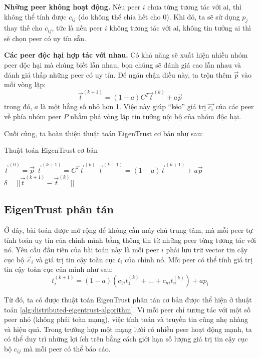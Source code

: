 \textbf{Những peer không hoạt động.} Nếu peer $i$ chưa từng tương tác với ai, thì không thể tính được $c_{ij}$ (do không thể chia hết cho 0).
Khi đó, ta sẽ sử dụng $p_j$ thay thế cho $c_{ij}$, tức là nếu peer $i$ không tương tác với ai, không tin tưởng ai thì sẽ chọn peer có uy tín sẵn.

\textbf{Các peer độc hại hợp tác với nhau.} Có khả năng sẽ xuất hiện nhiều nhóm peer độc hại mà chúng biết lẫn nhau, bọn chúng sẽ đánh giá cao lẫn nhau và đánh giá thấp những peer có uy tín.
Để ngăn chận điều này, ta trộn thêm $\vec{p}$ vào mỗi vòng lặp:
\[\vec{t}^{(k+1)} = (1 - a)C^{T}\vec{t}^{(k)} + a\vec{p}\]
trong đó, $a$ là một hằng số nhỏ hơn 1. Việc này giúp ``kéo'' giá trị $\vec{c_i}$ của các peer về phía nhóm peer $P$ nhằm phá vòng lặp tin tưởng nội bộ của nhóm độc hại.

Cuối cùng, ta hoàn thiện thuật toán EigenTrust cơ bản như sau:

\begin{algorithm}
  \caption{Thuật toán EigenTrust cơ bản}
  \label{alg:basic-eigentrust-algorithm}
  \begin{algorithmic}
    \State $\vec{t}^{(0)} = \vec{p}$
    \Repeat
    \State $\vec{t}^{(k+1)} = C^{T}\vec{t}^{(k)}$
    \State $\vec{t}^{(k+1)} = (1 - a)\vec{t}^{(k+1)} + a\vec{p}$
    \State $\delta = || \vec{t}^{(k+1)} - \vec{t}^{(k)} ||$
    \Until{$\delta < \epsilon$}
  \end{algorithmic}
\end{algorithm}

\subsection{EigenTrust phân tán}

Ở đây, bài toán được mở rộng để không cần máy chủ trung tâm, mà mỗi peer tự tính toán uy tín của chính mình bằng thông tin từ những peer từng tương tác với nó.
Yêu cầu đầu tiên của bài toán này là mỗi peer $i$ phải lưu trữ vector tin cậy cục bộ $\vec{c}_i$ và giá trị tin cậy toàn cục $t_i$ của chính nó.
Mỗi peer có thể tính giá trị tin cậy toàn cục của mình như sau:
\[t_i^{(k+1)} = (1 - a)(c_{1i}t_1^{(k)} + ... + c_{ni}t_n^{(k)}) + ap_i\]

Từ đó, ta có được thuật toán EigenTrust phân tán cơ bản được thể hiện ở thuật toán \ref{alg:distributed-eigentrust-algorithm}. 
Vì mỗi peer chỉ tương tác với một số peer nhỏ (không phải toàn mạng), việc tính toán và truyền tin cũng nhẹ nhàng và hiệu quả.
Trong trường hợp một mạng lưới có nhiều peer hoạt động mạnh, ta có thể duy trì những lợi ích trên bằng cách giới hạn số lượng giá trị tin cậy cục bộ $c_{ij}$ mà mỗi peer
có thể báo cáo.

